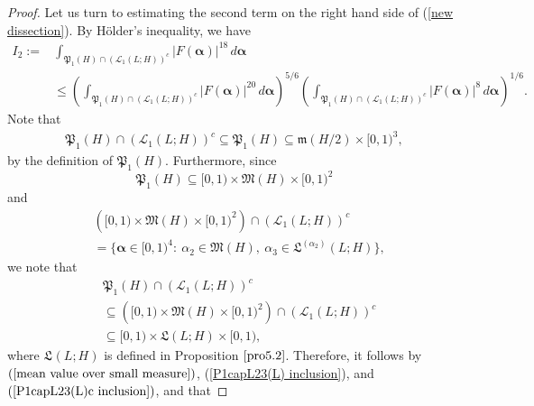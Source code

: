 \documentclass{amsart}%
\numberwithin{equation}{section}
\theoremstyle{remark}
\newcommand{\1}{\mathbbm{1}}
\newcommand{\balp}{\boldsymbol{\alpha}}
\begin{document}
\begin{proof}
Let us turn to estimating the second term on the right hand side of (\ref{new dissection}). By H\"older's inequality, we have
\begin{equation}\label{mean value over small measure}
\begin{aligned}
    I_2 :=&\int_{\mathfrak{P}_1(H)\cap (\mathcal{L}_{1}(L;H))^c}|F(\boldsymbol{\alpha})|^{18}\, d\balp \\
    & \le  \left(\int_{\mathfrak{P}_1(H)\cap (\mathcal{L}_{1}(L;H))^c}|F(\boldsymbol{\alpha})|^{20}\, d\balp\right)^{5/6}\left(\int_{\mathfrak{P}_1(H)\cap (\mathcal{L}_{1}(L;H))^c}|F(\boldsymbol{\alpha})|^{8}\, d\balp\right)^{1/6}.
\end{aligned}
\end{equation}
Note that 
\begin{equation}\label{P1capL23(L) inclusion}
\begin{aligned}
    \mathfrak{P}_1(H)\cap (\mathcal{L}_{1}(L;H))^c\subseteq  \mathfrak{P}_1(H)\subseteq \mathfrak{m}(H/2)\times [0,1)^3,
\end{aligned}
\end{equation}
by the definition of $\mathfrak{P}_1(H).$ Furthermore,  since \begin{equation*}
    \mathfrak{P}_1(H)\subseteq [0,1)\times \mathfrak{M}(H)\times [0,1)^2
\end{equation*}
and
\begin{equation*}
\begin{aligned}
  &\left([0,1)\times \mathfrak{M}(H)\times [0,1)^2\right)\cap (\mathcal{L}_{1}(L;H))^c \\&=\{\boldsymbol{\alpha}\in [0,1)^4:\ \alpha_2\in \mathfrak{M}(H),\ \alpha_3\in \mathfrak{L}^{(\alpha_2)}(L;H)\},
\end{aligned}
\end{equation*}
we note that
\begin{equation}\label{P1capL23(L)c inclusion}
\begin{aligned}
   &\mathfrak{P}_1(H)\cap (\mathcal{L}_{1}(L;H))^c\\
   &\subseteq \left([0,1)\times \mathfrak{M}(H)\times [0,1)^2\right)\cap (\mathcal{L}_{1}(L;H))^c\\
   &\subseteq [0,1)\times \mathfrak{L}(L;H)\times [0,1),
\end{aligned}
\end{equation}
where $ \mathfrak{L}^{}(L;H)$ is defined in Proposition $\ref{pro5.2}$. Therefore,  it follows by $(\ref{mean value over small measure})$, (\ref{P1capL23(L) inclusion}), and $(\ref{P1capL23(L)c inclusion})$, and  that

\end{proof}
\end{document}
